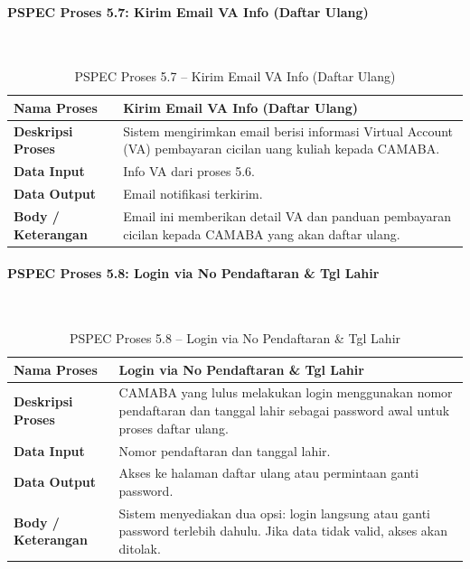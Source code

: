 \paragraph{PSPEC Proses 5.7: Kirim Email VA Info (Daftar Ulang)}~\\
\begin{longtable}{|p{}|p{}|}
	\caption{PSPEC Proses 5.7 -- Kirim Email VA Info (Daftar Ulang)}
	\label{table:3.pspec57}\\
	\hline
	\textbf{Nama Proses} & Kirim Email VA Info (Daftar Ulang) \\
	\hline
	\textbf{Deskripsi Proses} & Sistem mengirimkan email berisi informasi Virtual Account (VA) pembayaran cicilan uang kuliah kepada CAMABA. \\
	\hline
	\textbf{Data Input} & Info VA dari proses 5.6. \\
	\hline
	\textbf{Data Output} & Email notifikasi terkirim. \\
	\hline
	\textbf{Body / Keterangan} & Email ini memberikan detail VA dan panduan pembayaran cicilan kepada CAMABA yang akan daftar ulang. \\
	\hline
\end{longtable}

\paragraph{PSPEC Proses 5.8: Login via No Pendaftaran \& Tgl Lahir}~\\
\begin{longtable}{|p{}|p{}|}
	\caption{PSPEC Proses 5.8 -- Login via No Pendaftaran \& Tgl Lahir}
	\label{table:3.pspec58}\\
	\hline
	\textbf{Nama Proses} & Login via No Pendaftaran \& Tgl Lahir \\
	\hline
	\textbf{Deskripsi Proses} & CAMABA yang lulus melakukan login menggunakan nomor pendaftaran dan tanggal lahir sebagai password awal untuk proses daftar ulang. \\
	\hline
	\textbf{Data Input} & Nomor pendaftaran dan tanggal lahir. \\
	\hline
	\textbf{Data Output} & Akses ke halaman daftar ulang atau permintaan ganti password. \\
	\hline
	\textbf{Body / Keterangan} & Sistem menyediakan dua opsi: login langsung atau ganti password terlebih dahulu. Jika data tidak valid, akses akan ditolak. \\
	\hline
\end{longtable}

